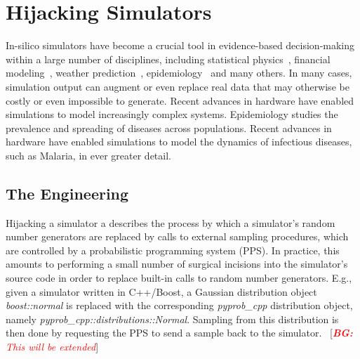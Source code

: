 \documentclass{article}
\newcommand{\bg}[1]{~{{[{\it \textcolor{red}{{\bf BG:} #1}}]}}}
\begin{document}


\section{Hijacking Simulators}
\label{sec:methods}
In-silico simulators have become a crucial tool in evidence-based decision-making within a large number of disciplines, including statistical physics~\cite{landau_binder_2014}, financial modeling~\cite{jackel2002monte},
weather prediction~\cite{evensen1994sequential}, epidemiology~\cite{smith2008towards} and many others.
In many cases, simulation output can augment or even replace real data that may otherwise be costly or even impossible to generate.
Recent advances in hardware have enabled simulations to model increasingly complex systems.
Epidemiology studies the prevalence and spreading of diseases across populations. Recent advances in hardware have enabled simulations to model the dynamics of infectious diseases, such as Malaria, in ever greater detail.


\subsection{The Engineering}
Hijacking a simulator a describes the process by which a simulator's random number generators are replaced by calls to external sampling procedures, which are controlled by a probabilistic programming system (PPS). In practice, this amounts to performing a small number of surgical incisions into the simulator's source code in order to replace built-in calls to random number generators. E.g., given a simulator written in C++/Boost\cite{schaling2011boost}, a Gaussian distribution object \textit{boost::normal} is replaced with the corresponding \textit{pyprob\_cpp} distribution object, namely \textit{pyprob\_cpp::distributions::Normal}. Sampling from this distribution is then done by requesting the PPS to send a sample back to the simulator. \bg{This will be extended}
\end{document}
